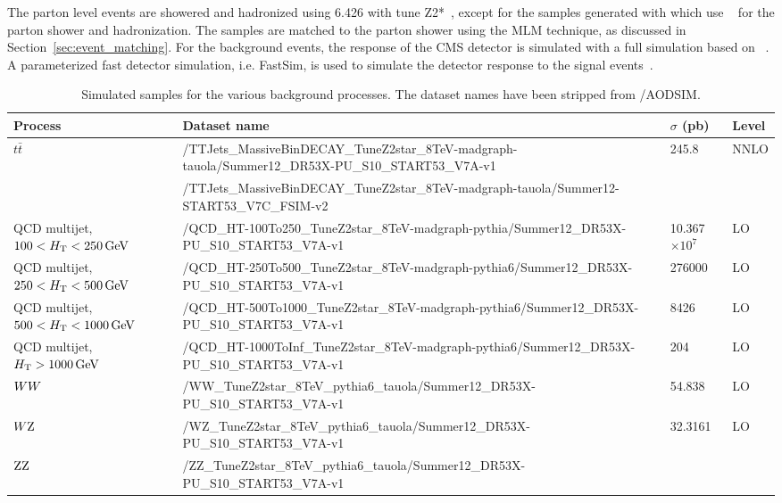 The parton level events are showered and hadronized using {\PYTHIA}6.426 with tune
Z2*~\cite{Chatrchyan:2013gfi}, except for the samples generated with \AMCATNLO which use 
\HERWIG~\cite{Corcella:2000bw,Corcella:2002jc} for the parton shower and hadronization.  
The \MADGRAPH samples are matched to the parton shower using the MLM technique, as discussed
in Section~\ref{sec:event_matching}.
For the background events, the response of the CMS detector is
simulated with a full simulation based on \GEANTfour~\cite{G4}.  A parameterized fast detector
simulation, i.e. FastSim, is used to simulate the detector response to the signal
events~\cite{fastsim}. 

\begin{table}
\fontsize{8 pt}{1 em}
\selectfont
\caption{Simulated samples for the various background processes. The dataset names have been stripped 
from /AODSIM.}
\begin{center}
\begin{tabular}{l l l l}
\toprule
Process & Dataset name & $\sigma$ (pb) & Level \\
\midrule
\multirow{2}{*}{$t\bar{t}$} &
/TTJets\_MassiveBinDECAY\_TuneZ2star\_8TeV-madgraph-tauola/Summer12\_DR53X-PU\_S10\_START53\_V7A-v1 
& 245.8 & NNLO \\
& /TTJets\_MassiveBinDECAY\_TuneZ2star\_8TeV-madgraph-tauola/Summer12-START53\_V7C\_FSIM-v2 & & \\
\midrule
QCD multijet, $100 < H_{\mathrm{T}} < 250\,\text{Ge\hspace{-.08em}V}$ & 
/QCD\_HT-100To250\_TuneZ2star\_8TeV-madgraph-pythia/Summer12\_DR53X-PU\_S10\_START53\_V7A-v1
& 10.367$\times 10^{7}$ & LO \\
QCD multijet, $250 < H_{\mathrm{T}} < 500\,\text{Ge\hspace{-.08em}V}$ &  
/QCD\_HT-250To500\_TuneZ2star\_8TeV-madgraph-pythia6/Summer12\_DR53X-PU\_S10\_START53\_V7A-v1
& 276000 & LO \\
QCD multijet, $500 < H_{\mathrm{T}} < 1000\,\text{Ge\hspace{-.08em}V}$ & 
/QCD\_HT-500To1000\_TuneZ2star\_8TeV-madgraph-pythia6/Summer12\_DR53X-PU\_S10\_START53\_V7A-v1 
& 8426 & LO \\
QCD multijet, $H_{\mathrm{T}}  > 1000\,\text{Ge\hspace{-.08em}V}$ & 
/QCD\_HT-1000ToInf\_TuneZ2star\_8TeV-madgraph-pythia6/Summer12\_DR53X-PU\_S10\_START53\_V7A-v1 
& 204 & LO \\
\midrule
$WW$ & /WW\_TuneZ2star\_8TeV\_pythia6\_tauola/Summer12\_DR53X-PU\_S10\_START53\_V7A-v1 &
54.838 & LO \\
$W\mathrm{Z}$ & /WZ\_TuneZ2star\_8TeV\_pythia6\_tauola/Summer12\_DR53X-PU\_S10\_START53\_V7A-v1 
& 32.3161 & LO \\
$\mathrm{Z}\mathrm{Z}$ & /ZZ\_TuneZ2star\_8TeV\_pythia6\_tauola/Summer12\_DR53X-PU\_S10\_START53\_V7A-v1

\end{tabular}
\end{center}
\end{table}
